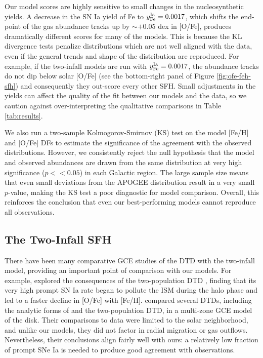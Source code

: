 \documentclass[twocolumn,twocolappendix]{aastex631}
\begin{document}
Our model scores are highly sensitive to small changes in the nucleosynthetic yields. A decrease in the SN Ia yield of Fe to $y_{\rm Fe}^{\rm Ia}=0.0017$, which shifts the end-point of the gas abundance tracks up by $\sim+0.05$ dex in [O/Fe], produces dramatically different scores for many of the models. This is because the KL divergence tests penalize distributions which are not well aligned with the data, even if the general trends and shape of the distribution are reproduced. For example, if the two-infall models are run with $y_{\rm Fe}^{\rm Ia}=0.0017$, the abundance tracks do not dip below solar [O/Fe] (see the bottom-right panel of Figure \ref{fig:ofe-feh-sfh}) and consequently they out-score every other SFH. Small adjustments in the yields can affect the quality of the fit between our models and the data, so we caution against over-interpreting the qualitative comparisons in Table \ref{tab:results}.

We also run a two-sample Kolmogorov-Smirnov (KS) test on the model [Fe/H] and [O/Fe] DFs to estimate the significance of the agreement with the observed distributions. However, we consistently reject the null hypothesis that the model and observed abundances are drawn from the same distribution at very high significance ($p<<0.05$) in each Galactic region. The large sample size means that even small deviations from the APOGEE distribution result in a very small $p$-value, making the KS test a poor diagnostic for model comparison. Overall, this reinforces the conclusion that even our best-performing models cannot reproduce all observations.

\subsection{The Two-Infall SFH}
\label{sec:two-infall-discussion}

There have been many comparative GCE studies of the DTD with the two-infall model, providing an important point of comparison with our models. For example, \citet{Matteucci2006-BimodalDTDConsequences} explored the consequences of the two-population DTD \citep{Mannucci2006-TwoPopulations}, finding that its very high prompt SN Ia rate began to pollute the ISM during the halo phase and led to a faster decline in [O/Fe] with [Fe/H]. \citet{Matteucci2009-DTDModels} compared several DTDs, including the analytic forms of \citet{Greggio2005-AnalyticalRates} and the two-population DTD, in a multi-zone GCE model of the disk. Their comparisons to data were limited to the solar neighborhood, and unlike our models, they did not factor in radial migration or gas outflows. Nevertheless, their conclusions align fairly well with ours: a relatively low fraction of prompt SNe Ia is needed to produce good agreement with observations.
\end{document}
